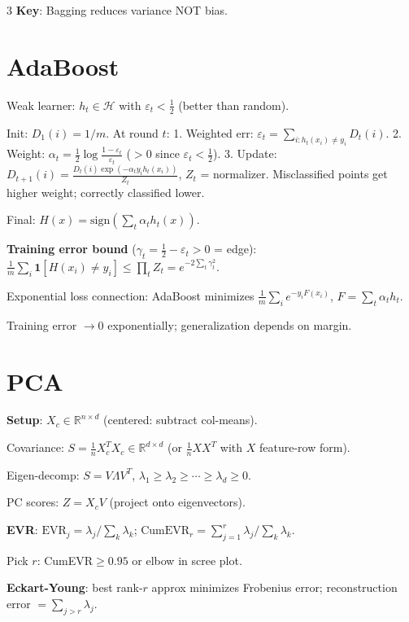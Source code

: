 \documentclass[8pt,fleqn]{extarticle}
\begin{document}
\begin{multicols}{3}
\textbf{Key}: Bagging reduces variance NOT bias.


\section*{AdaBoost}

Weak learner: $h_t\in\mathcal H$ with $\varepsilon_t<\tfrac12$ (better than random).

Init: $D_1(i)=1/m$. At round $t$:
1. Weighted err: $\varepsilon_t=\sum_{i:h_t(x_i)\ne y_i}D_t(i)$.
2. Weight: $\alpha_t=\tfrac12\log\frac{1-\varepsilon_t}{\varepsilon_t}$ ($>0$ since $\varepsilon_t<\tfrac12$).
3. Update: $D_{t+1}(i)=\frac{D_t(i)\exp(-\alpha_t y_i h_t(x_i))}{Z_t}$, $Z_t$ = normalizer.
   Misclassified points get higher weight; correctly classified lower.

Final: $H(x)=\text{sign}\!\left(\sum_t\alpha_t h_t(x)\right)$.

\textbf{Training error bound} ($\gamma_t=\tfrac12-\varepsilon_t>0$ = edge):
$\frac1m\sum_i\mathbf{1}[H(x_i)\ne y_i]\le\prod_t Z_t=e^{-2\sum_t\gamma_t^2}$.

Exponential loss connection: AdaBoost minimizes $\frac1m\sum_i e^{-y_i F(x_i)}$, $F=\sum_t\alpha_t h_t$.

Training error $\to0$ exponentially; generalization depends on margin.


\section*{PCA}

\textbf{Setup}: $X_c\in\mathbb R^{n\times d}$ (centered: subtract col-means).

Covariance: $S=\tfrac1n X_c^TX_c\in\mathbb R^{d\times d}$ (or $\tfrac1n XX^T$ with $X$ feature-row form).

Eigen-decomp: $S=V\Lambda V^T$, $\lambda_1\ge\lambda_2\ge\cdots\ge\lambda_d\ge0$.

PC scores: $Z=X_c V$ (project onto eigenvectors).

\textbf{EVR}: $\text{EVR}_j=\lambda_j/\sum_k\lambda_k$; $\text{CumEVR}_r=\sum_{j=1}^r\lambda_j/\sum_k\lambda_k$.

Pick $r$: CumEVR$\ge0.95$ or elbow in scree plot.

\textbf{Eckart-Young}: best rank-$r$ approx minimizes Frobenius error; reconstruction error $=\sum_{j>r}\lambda_j$.


\end{multicols}
\end{document}
